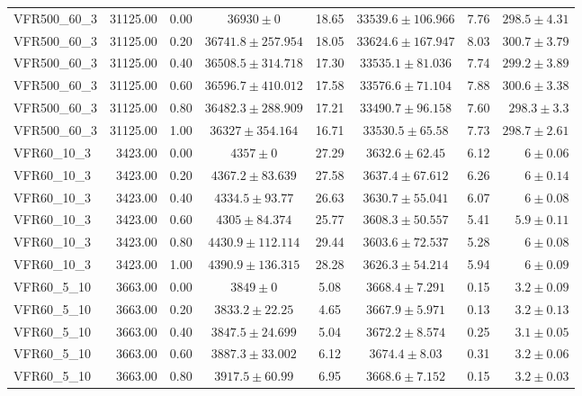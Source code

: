 \begin{longtable}{lrrccccr}
   \midrule
VFR500\_60\_3 & 31125.00 & 0.00 & $36930 \pm 0$ & 18.65 & $33539.6 \pm 106.966$ & 7.76 & $298.5 \pm 4.31$ \\ 
  VFR500\_60\_3 & 31125.00 & 0.20 & $36741.8 \pm 257.954$ & 18.05 & $33624.6 \pm 167.947$ & 8.03 & $300.7 \pm 3.79$ \\ 
  VFR500\_60\_3 & 31125.00 & 0.40 & $36508.5 \pm 314.718$ & 17.30 & $33535.1 \pm 81.036$ & 7.74 & $299.2 \pm 3.89$ \\ 
  VFR500\_60\_3 & 31125.00 & 0.60 & $36596.7 \pm 410.012$ & 17.58 & $33576.6 \pm 71.104$ & 7.88 & $300.6 \pm 3.38$ \\ 
  VFR500\_60\_3 & 31125.00 & 0.80 & $36482.3 \pm 288.909$ & 17.21 & $33490.7 \pm 96.158$ & 7.60 & $298.3 \pm 3.3$ \\ 
  VFR500\_60\_3 & 31125.00 & 1.00 & $36327 \pm 354.164$ & 16.71 & $33530.5 \pm 65.58$ & 7.73 & $298.7 \pm 2.61$ \\ 
   \midrule
VFR60\_10\_3 & 3423.00 & 0.00 & $4357 \pm 0$ & 27.29 & $3632.6 \pm 62.45$ & 6.12 & $6 \pm 0.06$ \\ 
  VFR60\_10\_3 & 3423.00 & 0.20 & $4367.2 \pm 83.639$ & 27.58 & $3637.4 \pm 67.612$ & 6.26 & $6 \pm 0.14$ \\ 
  VFR60\_10\_3 & 3423.00 & 0.40 & $4334.5 \pm 93.77$ & 26.63 & $3630.7 \pm 55.041$ & 6.07 & $6 \pm 0.08$ \\ 
  VFR60\_10\_3 & 3423.00 & 0.60 & $4305 \pm 84.374$ & 25.77 & $3608.3 \pm 50.557$ & 5.41 & $5.9 \pm 0.11$ \\ 
  VFR60\_10\_3 & 3423.00 & 0.80 & $4430.9 \pm 112.114$ & 29.44 & $3603.6 \pm 72.537$ & 5.28 & $6 \pm 0.08$ \\ 
  VFR60\_10\_3 & 3423.00 & 1.00 & $4390.9 \pm 136.315$ & 28.28 & $3626.3 \pm 54.214$ & 5.94 & $6 \pm 0.09$ \\ 
   \midrule
VFR60\_5\_10 & 3663.00 & 0.00 & $3849 \pm 0$ & 5.08 & $3668.4 \pm 7.291$ & 0.15 & $3.2 \pm 0.09$ \\ 
  VFR60\_5\_10 & 3663.00 & 0.20 & $3833.2 \pm 22.25$ & 4.65 & $3667.9 \pm 5.971$ & 0.13 & $3.2 \pm 0.13$ \\ 
  VFR60\_5\_10 & 3663.00 & 0.40 & $3847.5 \pm 24.699$ & 5.04 & $3672.2 \pm 8.574$ & 0.25 & $3.1 \pm 0.05$ \\ 
  VFR60\_5\_10 & 3663.00 & 0.60 & $3887.3 \pm 33.002$ & 6.12 & $3674.4 \pm 8.03$ & 0.31 & $3.2 \pm 0.06$ \\ 
  VFR60\_5\_10 & 3663.00 & 0.80 & $3917.5 \pm 60.99$ & 6.95 & $3668.6 \pm 7.152$ & 0.15 & $3.2 \pm 0.03$ \\ 

\end{longtable}
